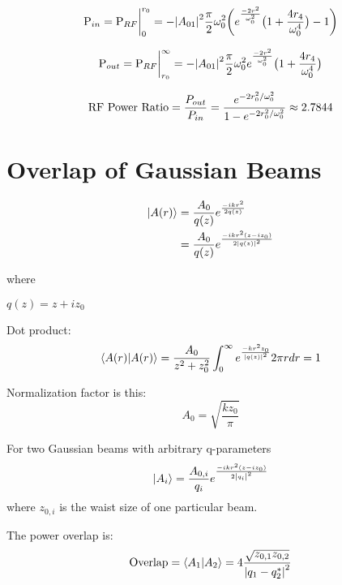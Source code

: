 \documentclass[10pt,a4paper]{book}
\begin{document}
\begin{appendices}
	\begin{equation}
	\text{P}_{in} \\
	= \text{P}_{RF} \biggr\rvert_0^{r_0} \\
	= - \abs{A_{01}}^2  \frac{\pi}{2} \omega_{0}^2 \bigg( e^{\frac{-2r^2}{\omega_{0}^2}} \big(1 + \frac{4 r_4}{\omega_{0}^4} \big) - 1 \bigg)
	\end{equation}
	
	\begin{equation}
	\text{P}_{out} \\
	= \text{P}_{RF} \biggr\rvert_{r_0}^{\infty}\\ 
	= - \abs{A_{01}}^2  \frac{\pi}{2} \omega_{0}^2 e^{\frac{-2r^2}{\omega_{0}^2}} \big(1 + \frac{4 r_4}{\omega_{0}^4} \big) 
	\end{equation}
	
	\begin{equation}
	\text{RF Power Ratio} 
	= \frac{P_{out}}{P_{in}} \\
	= \frac{e^{-2r_0^2/ \omega_{0}^2}} {1 - e^{-2r_0^2/ \omega_{0}^2 }} \approx 2.7844
	\end{equation}
	
	\chapter{Overlap of Gaussian Beams}
	
	\begin{equation}
	\begin{split}
	\ket{A(r)} 
	&= \frac{A_0}{q(z)} e^{\frac{-ikr^2}{2q(z)}}\\
	&= \frac{A_0}{q(z)} e^{\frac{-ikr^2(z-iz_0)}{2\abs{q(z)}^2}}
	\end{split}
	\end{equation}
	
	where 
	
	$q(z) = z + iz_0$
	
	Dot product:
	\begin{equation}
	\braket{A(r)|A(r)} 
	=  \frac{A_0}{z^2+z_0^2} \int_{0}^{\infty} e^{\frac{-kr^2 z_0}{\abs{q(z)}^2}} 2 \pi r dr = 1
	\end{equation}

	Normalization factor is this:
	\begin{equation}
	A_0 = \sqrt{\frac{k z_0}{\pi}}
	\end{equation}


	For two Gaussian beams with arbitrary q-parameters
	\begin{equation}
	\ket{A_i} = \frac{A_{0,i}}{q_i} e^{ \frac{-ikr^2(z-iz_0)}{2\abs{q_i}^2 }}
	\end{equation}
	where $z_{0,i}$ is the waist size of one particular beam.
	
	The power overlap is:
	\begin{equation}
	\text{Overlap} = \braket{A_1|A_2} = 4 \frac{ \sqrt{z_{0,1}z_{0,2}}}{\abs{q_1 - q_2^*}^2}
	\end{equation}

\end{appendices} 
\end{document}
